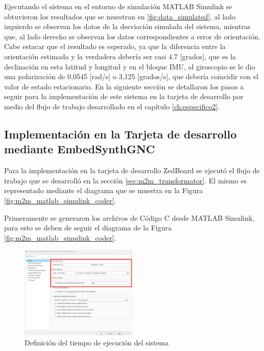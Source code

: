 Ejecutando el sistema en el entorno de simulación MATLAB Simulink se obtuvieron los resultados que se muestran en \ref{fig:data_simulated}, al lado izquierdo se observan los datos de la desviación simulada del sistema, mientras que, al lado derecho se observan los datos correspondientes a error de orientación. Cabe estacar que el resultado es esperado, ya que la diferencia entre la orientación estimada y la verdadera debería ser casi 4.7 [grados], que es la declinación en esta latitud y longitud y en el bloque IMU, al giroscopio se le dio una polarización de 0,0545 [rad/s] o 3,125 [grados/s], que debería coincidir con el valor de estado estacionario. En la siguiente sección se detallaron los pasos a seguir para la implementación de este sistema en la tarjeta de desarrollo por medio del flujo de trabajo desarrollado en el capítulo \ref{ch:especifico2}. 

\newpage

\subsection{Implementación en la Tarjeta de desarrollo mediante EmbedSynthGNC}


Para la implementación en la tarjeta de desarrollo ZedBoard se ejecutó el flujo de trabajo que se desarrolló en la sección \ref{sec:m2m_transformator}. El mismo es representado mediante el diagrama que se muestra en la Figura \ref{fig:m2m_matlab_simulink_coder}.

Primeramente se generaron los archivos de Código C desde MATLAB Simulink, para esto se deben de seguir el diagrama de la Figura \ref{fig:m2m_matlab_simulink_coder}. 

\begin{figure}[h!]
    \centering
    \includegraphics[width=0.5\textwidth]{fig/aditional/tiempo_ejecucion_imu.pdf}
    \caption{Definición del tiempo de ejecución del sistema}
    \label{fig:system_runtime_IMU}
\end{figure}

